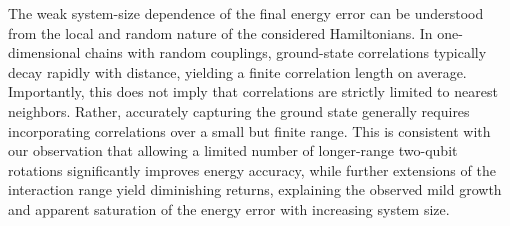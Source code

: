The weak system-size dependence of the final energy error can be understood from the local and random nature of the considered Hamiltonians. In one-dimensional chains with random couplings, ground-state correlations typically decay rapidly with distance, yielding a finite correlation length on average. Importantly, this does not imply that correlations are strictly limited to nearest neighbors. Rather, accurately capturing the ground state generally requires incorporating correlations over a small but finite range. This is consistent with our observation that allowing a limited number of longer-range two-qubit rotations significantly improves energy accuracy, while further extensions of the interaction range yield diminishing returns, explaining the observed mild growth and apparent saturation of the energy error with increasing system size.

